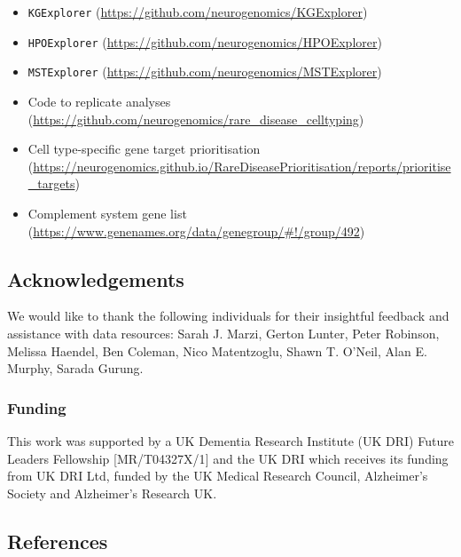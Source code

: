 \documentclass[
]{article}
\providecommand{\tightlist}{%
  \setlength{\itemsep}{0pt}\setlength{\parskip}{0pt}}\usepackage{longtable,booktabs,array}
\begin{document}
\begin{itemize}
\tightlist
\item
  \texttt{KGExplorer}
  (\url{https://github.com/neurogenomics/KGExplorer})
\item
  \texttt{HPOExplorer}
  (\url{https://github.com/neurogenomics/HPOExplorer})
\item
  \texttt{MSTExplorer}
  (\url{https://github.com/neurogenomics/MSTExplorer})
\item
  Code to replicate analyses
  (\url{https://github.com/neurogenomics/rare_disease_celltyping})
\item
  Cell type-specific gene target prioritisation
  (\url{https://neurogenomics.github.io/RareDiseasePrioritisation/reports/prioritise_targets})
\item
  Complement system gene list
  (\url{https://www.genenames.org/data/genegroup/\#!/group/492})
\end{itemize}

\subsection{Acknowledgements}\label{acknowledgements}

We would like to thank the following individuals for their insightful
feedback and assistance with data resources: Sarah J. Marzi, Gerton
Lunter, Peter Robinson, Melissa Haendel, Ben Coleman, Nico Matentzoglu,
Shawn T. O'Neil, Alan E. Murphy, Sarada Gurung.

\subsubsection{Funding}\label{funding}

This work was supported by a UK Dementia Research Institute (UK DRI)
Future Leaders Fellowship {[}MR/T04327X/1{]} and the UK DRI which
receives its funding from UK DRI Ltd, funded by the UK Medical Research
Council, Alzheimer's Society and Alzheimer's Research UK.

\subsection*{References}\label{references}
\end{document}

